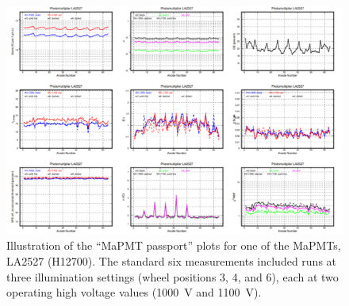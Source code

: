 \begin{figure}[!ht]
	\centering
	\includegraphics[width=1.0\textwidth,height=.7\textwidth]{figures/pavel_temp/LA2527_passport_temp.png}
	\caption{Illustration of the ``MaPMT passport'' plots for one of the MaPMTs, LA2527 (H12700). The standard six measurements included runs at three illumination settings (wheel positions 3, 4, and 6), each at two operating high voltage values (1000~V and 1100~V).}
	\label{fig:LA2527_passport}
\end{figure}
